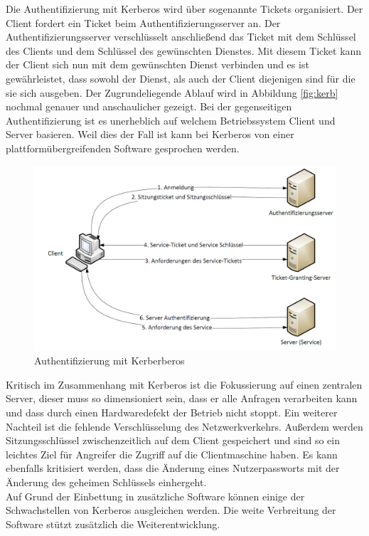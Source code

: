 \documentclass[
book,
a4paper,   
titlepage,  
halfparskip,
12pt        
]{scrartcl}
\begin{document}
\begin{onehalfspacing}
Die Authentifizierung mit Kerberos wird über sogenannte Tickets organisiert. Der Client fordert ein Ticket beim Authentifizierungsserver an. Der Authentifizierungsserver verschlüsselt anschließend das Ticket mit dem Schlüssel des Clients und dem Schlüssel des gewünschten Dienstes. Mit diesem Ticket kann der Client sich nun mit dem gewünschten Dienst verbinden und es ist gewährleistet, dass sowohl der Dienst, als auch der Client diejenigen sind für die sie sich ausgeben.  Der Zugrundeliegende Ablauf wird in Abbildung \vref{fig:kerb} nochmal genauer und anschaulicher gezeigt. Bei der gegenseitigen Authentifizierung ist es unerheblich auf welchem Betriebssystem Client und Server basieren. Weil dies der Fall ist kann bei Kerberos von einer plattformübergreifenden Software gesprochen werden.
\begin{figure}[h]
	\centering
	\includegraphics[width=1\linewidth]{kerberos.png}
	\caption[Kerberos]{Authentifizierung mit Kerberberos \cite[vgl. S.140]{kerberos2}}
	\label{fig:kerb}
\end{figure}

Kritisch im Zusammenhang mit Kerberos ist die Fokussierung auf einen zentralen Server, dieser muss so dimensioniert sein, dass er alle Anfragen verarbeiten kann und dass durch einen Hardwaredefekt der Betrieb nicht stoppt. Ein weiterer Nachteil ist die fehlende Verschlüsselung des Netzwerkverkehrs. Außerdem werden Sitzungsschlüssel zwischenzeitlich auf dem Client gespeichert und sind so ein leichtes Ziel für Angreifer die Zugriff auf die Clientmaschine haben. Es kann ebenfalls kritisiert werden, dass die Änderung eines Nutzerpassworts mit der Änderung des geheimen Schlüssels einhergeht.\\
Auf Grund der Einbettung in zusätzliche Software können einige der Schwachstellen von Kerberos ausgleichen werden. Die weite Verbreitung der Software \cite{datalabs} stützt zusätzlich die Weiterentwicklung.\cite[vgl. S.138f]{kerberos2}\cite{kerb3}


\end{onehalfspacing}
\end{document}
